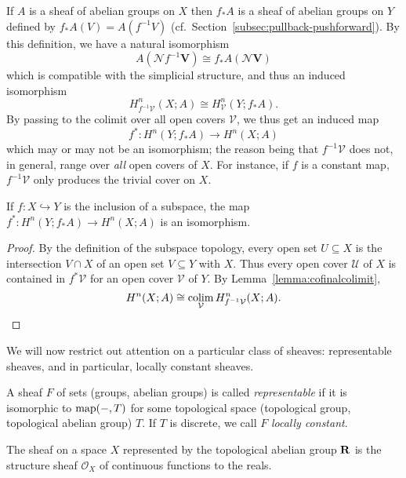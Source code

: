 \documentclass[a4paper,openany]{scrbook}
\newcommand{\nerve}{\mathcal N}
\begin{document}
If $A$ is a sheaf of abelian groups on $X$ then $f_*A$ is a sheaf of abelian groups on $Y$ defined by $f_*A(V) = A(f^{-1}V)$ (cf.\ Section~\ref{subsec:pullback-pushforward}). By this definition, we have a natural isomorphism
\[
A(\nerve f^{-1}\mathbf V) \cong f_*A(\nerve \mathbf V)
\]
which is compatible with the simplicial structure, and thus an induced isomorphism
\[
H_{f^{-1}\mathcal V}^n(X;A) \cong H_{\mathcal V}^n(Y;f_*A).
\]
By passing to the colimit over all open covers $\mathcal V$, we thus get an induced map
\begin{equation}\label{eq:inducedmaponcohomology}
f^*\colon H^n(Y;f_*A) \to H^n(X;A)
\end{equation}
which may or may not be an isomorphism; the reason being that $f^{-1}\mathcal V$ does not, in general, range over \emph{all} open covers of $X$. For instance, if $f$ is a constant map, $f^{-1}\mathcal V$ only produces the trivial cover on $X$.

\begin{lemma}\label{lemma:basechangeiso}
If $f\colon X \hookrightarrow Y$ is the inclusion of a subspace, the map $f^*\colon H^n(Y;f_*A) \to H^n(X;A)$ is an isomorphism.
\end{lemma}
\begin{proof}
By the definition of the subspace topology, every open set $U \subseteq X$ is the intersection $V \cap X$ of an open set $V \subseteq Y$ with $X$. Thus every open cover $\mathcal U$ of $X$ is contained in $f^*\mathcal V$ for an open cover $\mathcal V$ of $Y$. By Lemma~\ref{lemma:cofinalcolimit},
\[
H^n(X;A) \cong \operatorname*{colim}_{\mathcal V}H^n_{f^{-1}\mathcal V}(X;A).
\]
\end{proof}

We will now restrict out attention on a particular class of sheaves: representable sheaves, and in particular, locally constant sheaves.

\begin{defn}
A sheaf $F$ of sets (groups, abelian groups) is called \emph{representable} if it is isomorphic to $\operatorname{map}(-,T)$ for some topological space (topological group, topological abelian group) $T$. If $T$ is discrete, we call $F$ \emph{locally constant}.
\end{defn}

\begin{example}
The sheaf on a space $X$ represented by the topological abelian group $\mathbf R$ is the structure sheaf $\mathcal O_{X}$ of continuous functions to the reals.
\end{example}
\end{document}
